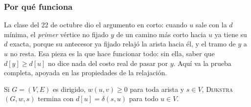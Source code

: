 \documentclass[11pt,letterpaper]{article}
\begin{document}
\subsubsection*{Por qué funciona}

La clase del 22 de octubre dio el argumento en corto: cuando $u$ sale
con la $d$ mínima, el \emph{primer} vértice no fijado $y$ de un camino
más corto hacia $u$ ya tiene su $d$ exacta, porque su antecesor ya
fijado relajó la arista hacia él, y el tramo de $y$ a $u$ no resta.
Esa pieza es la que hace funcionar todo: sin ella, saber que
$d[y] \ge d[u]$ no dice nada del costo real de pasar por $y$. Aquí va
la prueba completa, apoyada en las propiedades de la relajación.

\begin{teorema}
  \label{teo:dijkstra-correccion}
  Si $G = (V, E)$ es dirigido, $w(u, v) \ge 0$ para toda arista y
  $s \in V$, \textsc{Dijkstra}$(G, w, s)$ termina con
  $d[u] = \delta(s, u)$ para todo $u \in V$.
\end{teorema}
\end{document}
